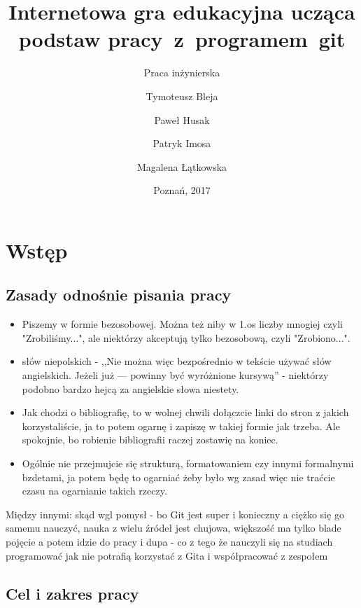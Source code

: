 \documentclass[11pt,a4paper,polish,thesis]{dcsbook}
\begin{document}
	
	\author{Tymoteusz Bleja \and Paweł Husak \and Patryk Imosa \and Magalena Łątkowska}
	\title{Internetowa gra edukacyjna ucząca podstaw pracy~z~programem~git}
	\subtitle{Praca inżynierska}
	\date{Poznań, 2017}
	\maketitle
	\frontmatter
	\tableofcontents{}
	\mainmatter
	
	\chapter{Wstęp}
	
	\section{Zasady odnośnie pisania pracy}
	
	\begin{itemize}	
		\item Piszemy w formie bezosobowej. Można też niby w 1.os liczby mnogiej czyli "Zrobiliśmy...", ale niektórzy akceptują tylko bezosobową, czyli "Zrobiono...".
		
		\item słów niepolskich - ,,Nie można więc bezpośrednio
		w tekście używać słów angielskich. Jeżeli już — powinny być wyróżnione kursywą'' - niektórzy podobno bardzo hejcą za angielskie słowa niestety.
			
		\item Jak chodzi o bibliografię, to w wolnej chwili dołączcie linki do stron z jakich korzystaliście, ja to potem ogarnę i zapiszę w takiej formie jak trzeba. Ale spokojnie, bo robienie bibliografii raczej zostawię na koniec.
		
		\item Ogólnie nie przejmujcie się strukturą, formatowaniem czy innymi formalnymi bzdetami, ja potem będę to ogarniać żeby było wg zasad więc nie traćcie czasu na ogarnianie takich rzeczy.
	\end{itemize}
	
	Między innymi: 
	skąd wgl pomysł - bo Git jest super i konieczny a ciężko się go samemu nauczyć, nauka z wielu źródeł jest chujowa, większość ma tylko blade pojęcie a potem idzie do pracy i dupa - co z tego że nauczyli się na studiach programować jak nie potrafią korzystać z Gita i współpracować z zespołem
		
	\section*{Cel i zakres pracy}
	
\end{document}
